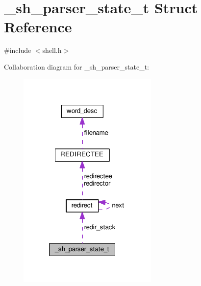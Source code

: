 \hypertarget{struct__sh__parser__state__t}{}\section{\+\_\+sh\+\_\+parser\+\_\+state\+\_\+t Struct Reference}
\label{struct__sh__parser__state__t}


{\ttfamily \#include $<$shell.\+h$>$}



Collaboration diagram for \+\_\+sh\+\_\+parser\+\_\+state\+\_\+t\+:
\nopagebreak
\begin{figure}[H]
\begin{center}
\leavevmode
\includegraphics[width=195pt]{struct__sh__parser__state__t__coll__graph}
\end{center}
\end{figure}
